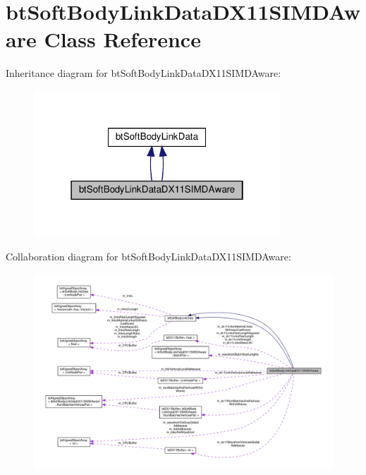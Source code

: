 \hypertarget{classbtSoftBodyLinkDataDX11SIMDAware}{}\section{bt\+Soft\+Body\+Link\+Data\+D\+X11\+S\+I\+M\+D\+Aware Class Reference}
\label{classbtSoftBodyLinkDataDX11SIMDAware}


Inheritance diagram for bt\+Soft\+Body\+Link\+Data\+D\+X11\+S\+I\+M\+D\+Aware\+:
\nopagebreak
\begin{figure}[H]
\begin{center}
\leavevmode
\includegraphics[width=262pt]{classbtSoftBodyLinkDataDX11SIMDAware__inherit__graph}
\end{center}
\end{figure}


Collaboration diagram for bt\+Soft\+Body\+Link\+Data\+D\+X11\+S\+I\+M\+D\+Aware\+:
\nopagebreak
\begin{figure}[H]
\begin{center}
\leavevmode
\includegraphics[width=350pt]{classbtSoftBodyLinkDataDX11SIMDAware__coll__graph}
\end{center}
\end{figure}
